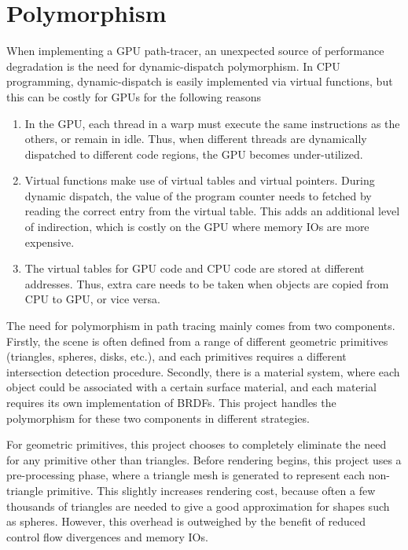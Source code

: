 \section{Polymorphism}
When implementing a GPU path-tracer, an unexpected source of performance degradation is the need for dynamic-dispatch polymorphism. In CPU programming, dynamic-dispatch is easily implemented via virtual functions, but this can be costly for GPUs for the following reasons
\begin{enumerate}
    \item In the GPU, each thread in a warp must execute the same instructions as the others, or remain in idle. Thus, when different threads are dynamically dispatched to different code regions, the GPU becomes under-utilized.
    
    \item Virtual functions make use of virtual tables and virtual pointers. During dynamic dispatch, the value of the program counter needs to fetched by reading the correct entry from the virtual table. This adds an additional level of indirection, which is costly on the GPU where memory IOs are more expensive.
    
    \item The virtual tables for GPU code and CPU code are stored at different addresses. Thus, extra care needs to be taken when objects are copied from CPU to GPU, or vice versa.
\end{enumerate}
The need for polymorphism in path tracing mainly comes from two components. Firstly, the scene is often defined from a range of different geometric primitives (triangles, spheres, disks, etc.), and each primitives requires a different intersection detection procedure. Secondly, there is a material system, where each object could be associated with a certain surface material, and each material requires its own implementation of BRDFs. This project handles the polymorphism for these two components in different strategies.

For geometric primitives, this project chooses to completely eliminate the need for any primitive other than triangles. Before rendering begins, this project uses a pre-processing phase, where a triangle mesh is generated to represent each non-triangle primitive. This slightly increases rendering cost, because often a few thousands of triangles are needed to give a good approximation for shapes such as spheres. However, this overhead is outweighed by the benefit of reduced control flow divergences and memory IOs.

